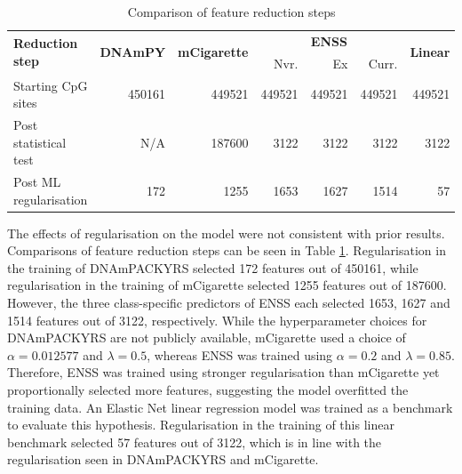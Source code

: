 \documentclass[draft]{article}
\begin{document}
\begin{table}
    \caption{Comparison of feature reduction steps} \label{table:sites-used}
    \begin{tabularx}{\textwidth}{X r r r r r r}
        \toprule
        \multirow{2}{*}{\textbf{Reduction step}} & \multirow{2}{*}{\textbf{DNAmPY}} & \multirow{2}{*}{\textbf{mCigarette}} & \multicolumn{3}{c}{\textbf{ENSS}} & \multirow{2}{*}{\textbf{Linear}}                               \\
        \cmidrule(lr){4-6}
                                                 &                                  &                                      & Nvr.                                    & Ex                                   & Curr.        &              \\
        \midrule
        Starting CpG sites                       & \num{450161}                     & \num{449521}                         & \num{449521}                            & \num{449521}                         & \num{449521} & \num{449521} \\
        \addlinespace
        Post statistical test                    & N/A                              & \num{187600}                         & \num{3122}                              & \num{3122}                           & \num{3122}   & \num{3122}   \\
        \addlinespace
        Post ML regularisation                   & \num{172}                        & \num{1255}                           & \num{1653}                              & \num{1627}                           & \num{1514}   & \num{57}     \\
        \bottomrule
    \end{tabularx}
\end{table}

The effects of regularisation on the model were not consistent with prior results. Comparisons of feature reduction steps can be seen in Table \ref{table:sites-used}. Regularisation in the training of DNAmPACKYRS selected 172 features out of \num{450161}, while regularisation in the training of mCigarette selected \num{1255} features out of \num{187600}. However, the three class-specific predictors of ENSS each selected 1653, 1627 and 1514 features out of 3122, respectively. While the hyperparameter choices for DNAmPACKYRS are not publicly available, mCigarette used a choice of \(\alpha = 0.012577\) and \(\lambda = 0.5\), whereas ENSS was trained using \(\alpha = 0.2\) and \(\lambda = 0.85\). Therefore, ENSS was trained using stronger regularisation than mCigarette yet proportionally selected more features, suggesting the model overfitted the training data. An Elastic Net linear regression model was trained as a benchmark to evaluate this hypothesis. Regularisation in the training of this linear benchmark selected 57 features out of 3122, which is in line with the regularisation seen in DNAmPACKYRS and mCigarette. 
\end{document}
